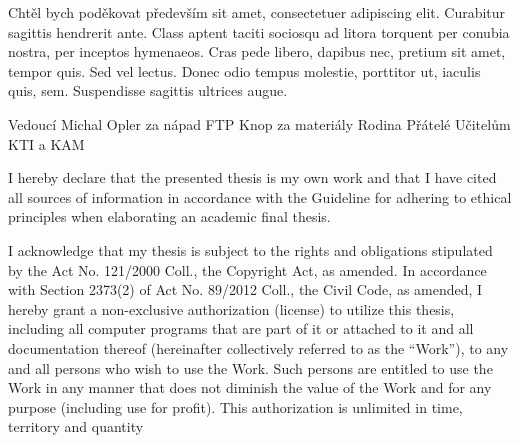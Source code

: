 \documentclass[english,bachelor,bw,unicode,oneside]{ctufit-thesis}
\begin{document}
\frontmatter\frontmatterinit{} %

\thispagestyle{empty}\maketitle\thispagestyle{empty}\cleardoublepage{} %


\imprintpage{} %
\stopTOCentries %


\begin{acknowledgmentpage}
	Chtěl bych poděkovat především sit amet, consectetuer adipiscing elit. Curabitur sagittis hendrerit ante. Class aptent taciti sociosqu ad litora torquent per conubia nostra, per inceptos hymenaeos. Cras pede libero, dapibus nec, pretium sit amet, tempor quis. Sed vel lectus. Donec odio tempus molestie, porttitor ut, iaculis quis, sem. Suspendisse sagittis ultrices augue.

	Vedoucí
	Michal Opler za nápad FTP
	Knop za materiály
	Rodina
	Přátelé
	Učitelům KTI a KAM
\end{acknowledgmentpage}


\begin{declarationpage}
	I hereby declare that the presented thesis is my own work and that I have cited all sources of
	information in accordance with the Guideline for adhering to ethical principles when elaborating an
	academic final thesis.

	I acknowledge that my thesis is subject to the rights and obligations stipulated by the Act No.
	121/2000 Coll., the Copyright Act, as amended. In accordance with Section 2373(2) of Act No.
	89/2012 Coll., the Civil Code, as amended, I hereby grant a non-exclusive authorization (license) to
	utilize this thesis, including all computer programs that are part of it or attached to it and all
	documentation thereof (hereinafter collectively referred to as the ``Work''), to any and all persons
	who wish to use the Work. Such persons are entitled to use the Work in any manner that does not
	diminish the value of the Work and for any purpose (including use for profit). This authorization is
	unlimited in time, territory and quantity
\end{declarationpage}
\end{document}
